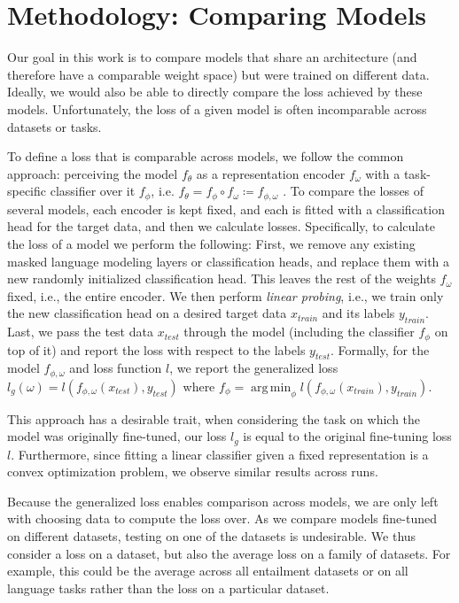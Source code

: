 \documentclass[nohyperref]{article}
\theoremstyle{plain}
\theoremstyle{definition}
\theoremstyle{remark}
\DeclareMathOperator*{\argmin}{arg\,min}
\begin{document}
\section{Methodology: Comparing Models}
Our goal in this work is to compare models that share an architecture (and therefore have a comparable weight space) but were trained on different data.
Ideally, we would also be able to directly compare the loss achieved by these models.
Unfortunately, the loss of a given model is often incomparable across datasets or tasks. 

To define a loss that is comparable across models, we follow the common approach: perceiving the model $f_\theta$ as a representation encoder $f_\omega$ with a task-specific classifier over it $f_\phi$, i.e. $f_\theta = f_\phi \circ f_\omega \coloneqq f_{\phi,\omega} $ \citep{choshen2022start,Rame2022RecyclingDM}. 
To compare the losses of several models, each encoder is kept fixed, and each is fitted with a classification head for the target data, and then we calculate losses. %
Specifically, to calculate the loss of a model we perform the following: First, we remove any existing masked language modeling layers or classification heads, and replace them with a new randomly initialized classification head. This leaves the rest of the weights $f_\omega$ fixed, i.e., the entire encoder. We then perform \emph{linear probing}, i.e., we train only the new classification head on a desired target data $x_{train}$ and its labels $ y_{train}$. Last, we pass the test data $x_{test}$ through the model (including the classifier $f_{\phi}$ on top of it) and report the loss with respect to the labels $y_{test}$. 
Formally, for the model $f_{\phi,\omega}$ and loss function $l$, we report the generalized loss $l_g(\omega)=l(f_{\phi,\omega}(x_{test}),y_{test})$ 
where $f_{\phi}=\argmin_{\phi} l(f_{\phi,\omega}(x_{train}),y_{train})$.

This approach has a desirable trait, when considering the task on which the model was originally fine-tuned, our loss $l_g$ is equal to the original fine-tuning loss $l$.
Furthermore, since fitting a linear classifier given a fixed representation is a convex optimization problem, we observe similar results across runs. 

Because the generalized loss enables comparison across models, we are only left with choosing data to compute the loss over. %
As we compare models fine-tuned on different datasets, testing on one of the datasets is undesirable. We thus consider a loss on a dataset, but also the average loss on a family of datasets. For example, this could be the average across all entailment datasets or on all language tasks rather than the loss on a particular dataset.
\end{document}
